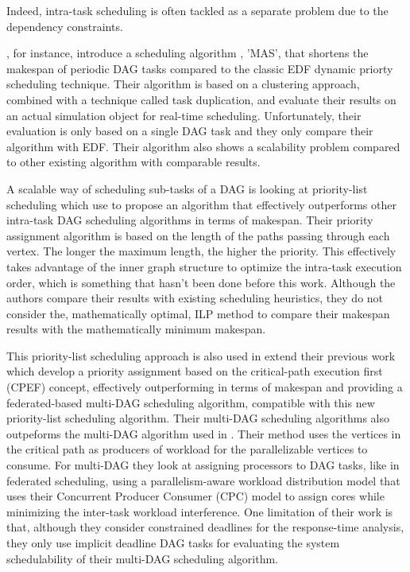 Indeed, intra-task scheduling\cite{He2019DagIntra}\cite{Xiao2019}
\cite{Shi2024DagExecGroups}\cite{Zhao2024GATDRLmodel}\cite{Lee2021GlobalDagSchedDRL}
\cite{GuanFRTDS2020RL} is often tackled as a separate
problem due to the dependency constraints.

\cite{Xiao2019}, for instance, introduce a scheduling algorithm 
, 'MAS', that shortens the makespan of periodic DAG tasks
compared to the classic EDF dynamic priorty scheduling technique.
Their algorithm is based on a clustering approach, combined with
a technique called task duplication, and evaluate their results
on an actual simulation object for real-time scheduling.
Unfortunately, their evaluation is only based on a single DAG task
and they only compare their algorithm with EDF.
Their algorithm also shows a scalability problem compared to 
other existing algorithm with comparable results.

A scalable way of scheduling sub-tasks of a DAG 
is looking at priority-list scheduling
which \cite{He2019DagIntra} use to propose 
an algorithm that effectively outperforms
other intra-task DAG scheduling algorithms
in terms of makespan.
Their priority assignment algorithm
is based on the length of the paths passing through each vertex.
The longer the maximum length, the higher the priority.
This effectively takes advantage of the inner graph structure
to optimize the intra-task execution order,
which is something that hasn't been done before this work.
Although the authors compare their results with existing
scheduling heuristics, they do not consider 
the, mathematically optimal, ILP method to compare
their makespan results with the mathematically minimum makespan.

This priority-list scheduling approach is also 
used in \cite{Zhao2022DAGsched} extend their previous work\cite{zhao2020DAGsched}
which develop a priority assignment based on 
the critical-path execution first (CPEF) concept,
effectively outperforming \cite{He2019DagIntra}
in terms of makespan and providing 
a federated-based multi-DAG scheduling algorithm,
compatible with this new priority-list scheduling algorithm.
Their multi-DAG scheduling algorithms also outpeforms 
the multi-DAG algorithm used in \cite{He2019DagIntra}.
Their method uses the vertices in the critical path 
as producers of workload for the parallelizable vertices
to consume.
For multi-DAG they look at assigning processors
to DAG tasks, like in federated scheduling, using 
a parallelism-aware workload distribution model
that uses their Concurrent Producer Consumer (CPC) model
to assign cores while minimizing the inter-task workload interference.
One limitation of their work is that,
although they consider constrained deadlines for the response-time
analysis, they only use implicit deadline DAG tasks 
for evaluating the system schedulability of their multi-DAG 
scheduling algorithm.

